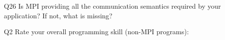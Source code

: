 \begin{description}%
\item{Q26} Is MPI providing all the communication semantics required by your application? If not, what is missing?%
\item{Q2} Rate your overall programming skill (non-MPI programs):%
\end{description}%
